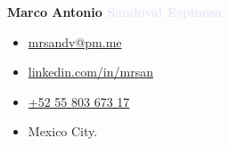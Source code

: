 \documentclass[letterpaper]{article}
\begin{document}
\thispagestyle{empty}
\noindent
\textbf{\Huge \textcolor{darklavender}{Marco Antonio} \textcolor{lavender}{Sandoval Espinosa}}\par

\begin{flushleft}

\end{flushleft}\par

\noindent
\begin{itemize}[itemsep=0em]
\item[\faAt] \href{mailto:mrsandv@pm.me}{mrsandv@pm.me}
\item[\faLinkedin]\href{https://linkedin.com/in/mrsan}{linkedin.com/in/mrsan}
\item[\faPhone] \href{tel:+525580367317}{+52 55 803 673 17}
\item[\faMapMarker] Mexico City.
\end{itemize}
\end{document}
